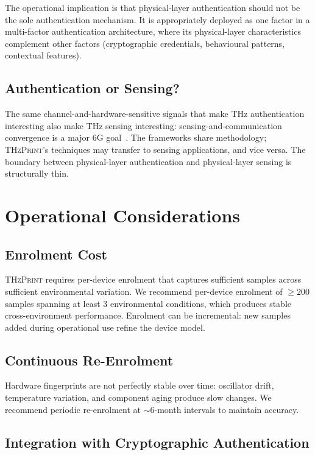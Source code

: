 \documentclass[sigconf,nonacm]{acmart}
\begin{document}
The operational implication is that physical-layer authentication
should not be the sole authentication mechanism. It is appropriately
deployed as one factor in a multi-factor authentication architecture,
where its physical-layer characteristics complement other factors
(cryptographic credentials, behavioural patterns, contextual
features).

\subsection{Authentication or Sensing?}

The same channel-and-hardware-sensitive signals that make THz
authentication interesting also make THz sensing interesting:
sensing-and-communication convergence is a major 6G
goal~\cite{liu2024isac}. The frameworks share methodology;
\textsc{THzPrint}'s techniques may transfer to sensing
applications, and vice versa. The boundary between physical-layer
authentication and physical-layer sensing is structurally thin.

\section{Operational Considerations}

\subsection{Enrolment Cost}

\textsc{THzPrint} requires per-device enrolment that captures
sufficient samples across sufficient environmental variation. We
recommend per-device enrolment of $\geq 200$ samples spanning at
least 3 environmental conditions, which produces stable
cross-environment performance. Enrolment can be incremental: new
samples added during operational use refine the device model.

\subsection{Continuous Re-Enrolment}

Hardware fingerprints are not perfectly stable over time:
oscillator drift, temperature variation, and component aging
produce slow changes. We recommend periodic re-enrolment at
$\sim 6$-month intervals to maintain accuracy.

\subsection{Integration with Cryptographic Authentication}
\end{document}
